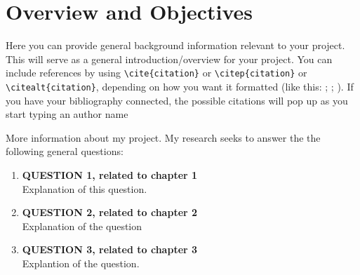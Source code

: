\section{Overview and Objectives}
Here you can provide general background information relevant to your project. This will serve as a general introduction/overview for your project. You can include references by using \texttt{\textbackslash cite\{citation\}} or \texttt{\textbackslash citep\{citation\}} or \texttt{\textbackslash citealt\{citation\}}, depending on how you want it formatted (like this: \cite{Cohen2016}; \citep{Cohen2016}; \citealt{Cohen2016}). If you have your bibliography connected, the possible citations will pop up as you start typing an author name 

More information about my project. My research seeks to answer the the following general questions:
\begin{enumerate}
    \item \textbf{QUESTION 1, related to chapter 1} \\
    Explanation of this question.
    
    \item \textbf{QUESTION 2, related to chapter 2} \\
    Explanation of the question

    \item \textbf{QUESTION 3, related to chapter 3} \\
    Explantion of the question.
    
\end{enumerate}
